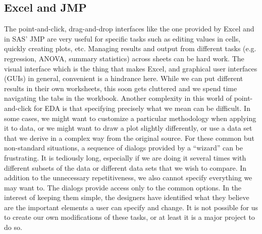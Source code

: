 \subsection{Excel and JMP}
The point-and-click, drag-and-drop interfaces like the one provided by
Excel and in SAS' JMP are very useful for specific tasks such as
editing values in cells, quickly creating plots, etc.  Managing
results and output from different tasks (e.g. regression, ANOVA,
summary statistics) across sheets can be hard work.  The visual
interface which is the thing that makes Excel, and graphical user
interfaces (GUIs) in general, convenient is a hindrance here.  While
we can put different results in their own worksheets, this soon gets
cluttered and we spend time navigating the tabs in the workbook.
Another complexity in this world of point-and-click for EDA is that
specifying precisely what we mean can be difficult.  In some cases, we
might want to customize a particular methodology when applying it to
data, or we might want to draw a plot slightly differently, or use a
data set that we derive in a complex way from the original source.  For
these common but non-standard situations, a sequence of dialogs
provided by a ``wizard'' can be frustrating.  It is tediously long,
especially if we are doing it several times with different subsets of
the data or different data sets that we wish to compare.  In addition
to the unnecessary repetitiveness, we also cannot specify everything
we may want to. The dialogs provide access only to the common
options. In the interest of keeping them simple, the designers have
identified what they believe are the important elements a user can
specify and change.  It is not possible for us to create our own
modifications of these tasks, or at least it is a major project to do
so.

